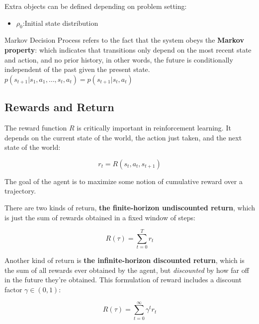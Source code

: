 Extra objects can be defined depending on problem setting:
\begin{itemize}
		\item $\rho_0$:Initial state distribution
\end{itemize}

Markov Decision Process refers to the fact that the system obeys the \textbf{Markov property}: which indicates that transitions only depend on the most recent state and action, and no prior history, in other words, the future is conditionally independent of the past given the present state. $ p\left(s_{t+1} | s_{1}, a_{1}, \ldots, s_{t}, a_{t}\right)=p\left(s_{t+1} | s_{t}, a_{t}\right) $


\subsection{Rewards and Return}

The reward function \(R\) is critically important in reinforcement learning. It depends on the current state of the world, the action just taken, and the next state of the world:

\begin{center}
		\begin{equation}
				r_{t}=R\left(s_{t}, a_{t}, s_{t+1}\right)
		\end{equation}
\end{center}

The goal of the agent is to maximize some notion of cumulative reward over a trajectory.

There are two kinds of return, \textbf{the finite-horizon undiscounted return}, which is just the sum of rewards obtained in a fixed window of steps:

\begin{center}
		\begin{equation} \label{eq:1}
				R(\tau)=\sum_{t=0}^{T} r_{t}
		\end{equation}
\end{center}

Another kind of return is \textbf{the infinite-horizon discounted return}, which is the sum of all rewards ever obtained by the agent, but \textit{discounted} by how far off in the future they’re obtained. This formulation of reward includes a discount factor \(\gamma \in(0,1)\):

\begin{center}
		\begin{equation} \label{eq:2}
				R(\tau)=\sum_{t=0}^{\infty} \gamma^{t} r_{t}
		\end{equation}
\end{center}

